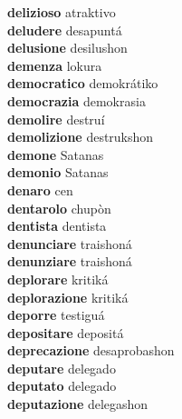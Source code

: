 \textbf{delizioso } atraktivo \\
\textbf{deludere } desapuntá \\
\textbf{delusione } desilushon \\
\textbf{demenza } lokura \\
\textbf{democratico } demokrátiko \\
\textbf{democrazia } demokrasia \\
\textbf{demolire } destruí \\
\textbf{demolizione } destrukshon \\
\textbf{demone } Satanas \\
\textbf{demonio } Satanas \\
\textbf{denaro } cen \\
\textbf{dentarolo } chupòn \\
\textbf{dentista } dentista \\
\textbf{denunciare } traishoná \\
\textbf{denunziare } traishoná \\
\textbf{deplorare } kritiká \\
\textbf{deplorazione } kritiká \\
\textbf{deporre } testiguá \\
\textbf{depositare } depositá \\
\textbf{deprecazione } desaprobashon \\
\textbf{deputare } delegado \\
\textbf{deputato } delegado \\
\textbf{deputazione } delegashon \\
